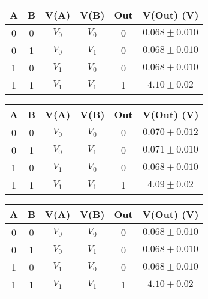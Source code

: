\begin{table}[H]
  \centering
  \begin{subtable}[H]{0.5\textwidth}
    \centering
    \begin{tabular}[t]{c  c | c  c | c  c}
      \hline
      A & B & V(A) & V(B) & Out & V(Out) (V)\\
      \hline
      0 & 0 & $V_{0}$ & $V_{0}$ & 0 & $0.068 \pm 0.010$ \\
      0 & 1 & $V_{0}$ & $V_{1}$ & 0 & $0.068 \pm 0.010$ \\
      1 & 0 & $V_{1}$ & $V_{0}$ & 0 & $0.068 \pm 0.010$ \\
      1 & 1 & $V_{1}$ & $V_{1}$ & 1 & $4.10 \pm 0.02$ \\
      \hline
    \end{tabular}
  \end{subtable}

  \vspace{.5cm}

  \begin{subtable}[H]{0.5\textwidth}
    \centering
    \begin{tabular}[t]{c  c | c  c | c  c}
      \hline
      A & B & V(A) & V(B) & Out & V(Out) (V)\\
      \hline
      0 & 0 & $V_{0}$ & $V_{0}$ & 0 & $0.070 \pm 0.012$ \\
      0 & 1 & $V_{0}$ & $V_{1}$ & 0 & $0.071 \pm 0.010$ \\
      1 & 0 & $V_{1}$ & $V_{0}$ & 0 & $0.068 \pm 0.010$ \\
      1 & 1 & $V_{1}$ & $V_{1}$ & 1 & $4.09 \pm 0.02$ \\
      \hline
    \end{tabular}
  \end{subtable}

  \vspace{.5mm}

  \begin{subtable}[H]{0.5\textwidth}
    \centering
    \begin{tabular}[t]{c  c | c  c | c  c}
      \hline
      A & B & V(A) & V(B) & Out & V(Out) (V)\\
      \hline
      0 & 0 & $V_{0}$ & $V_{0}$ & 0 & $0.068 \pm 0.010$ \\
      0 & 1 & $V_{0}$ & $V_{1}$ & 0 & $0.068 \pm 0.010$ \\
      1 & 0 & $V_{1}$ & $V_{0}$ & 0 & $0.068 \pm 0.010$ \\
      1 & 1 & $V_{1}$ & $V_{1}$ & 1 & $4.10 \pm 0.02$ \\
      \hline
    \end{tabular}
  \end{subtable}


\end{table}
